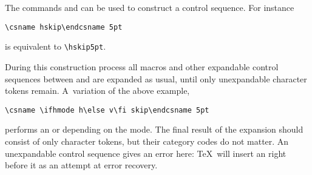 \documentclass[letterpaper]{book}
\begin{document}
The commands  and  can be used
to construct a control sequence. 
For instance
\begin{verbatim}
\csname hskip\endcsname 5pt
\end{verbatim}
is equivalent to \verb=\hskip5pt=.

During this construction process
all macros and other expandable control sequences
between  and 
are expanded as usual, until only unexpandable
character tokens remain. A~variation of the above example,
\begin{verbatim}
\csname \ifhmode h\else v\fi skip\endcsname 5pt
\end{verbatim}
performs an  or  depending on the mode.
The final result of the expansion should 
consist of only character tokens, but
their category codes do not matter.
An unexpandable control sequence gives an error here:
\TeX\ will insert an  right before it
as an attempt at error recovery.
\end{document}
